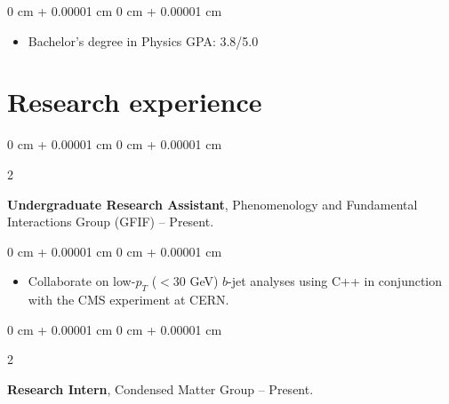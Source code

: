 \documentclass[10pt, letterpaper]{article}
\newenvironment{highlights}{
    \begin{itemize}[
        topsep=0.10 cm,
        parsep=0.10 cm,
        partopsep=0pt,
        itemsep=0pt,
        leftmargin=0 cm + 10pt
    ]
}{
    \end{itemize}
} %
\newenvironment{onecolentry}{
    \begin{adjustwidth}{
        0 cm + 0.00001 cm
    }{
        0 cm + 0.00001 cm
    }
}{
    \end{adjustwidth}
} %
\newenvironment{twocolentry}[2][]{
    \onecolentry
    \def\secondColumn{#2}
    \setcolumnwidth{\fill, 4.5 cm}
    \begin{paracol}{2}
}{
    \switchcolumn \raggedleft \secondColumn
    \end{paracol}
    \endonecolentry
} %
\begin{document}
        \vspace{0.10 cm}
        \begin{onecolentry}
            \begin{highlights}
                \item Bachelor's degree in Physics \hfill GPA: 3.8/5.0
            \end{highlights}
        \end{onecolentry}



    
    \section{Research experience}



        
        \begin{twocolentry}{
            2024 – Present.
        }
            \textbf{Undergraduate Research Assistant}, Phenomenology and Fundamental Interactions Group (GFIF)\end{twocolentry}

        \vspace{0.10 cm}
        \begin{onecolentry}
            \begin{highlights}
                \item Collaborate on low-$p_T$ ($<30$ GeV) $b$-jet analyses using C++ in conjunction with the CMS experiment at CERN.
            \end{highlights}
        \end{onecolentry}


        \vspace{0.2 cm}

        \begin{twocolentry}{
            2023 – Present.
        }
            \textbf{Research Intern}, Condensed Matter Group\end{twocolentry}
\end{document}
